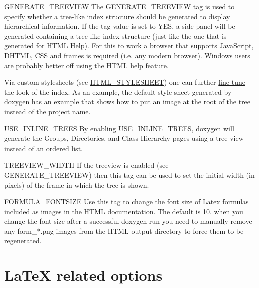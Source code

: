 \begin{DoxyDescription}
\label{config_cfg_generate_treeview}
\hypertarget{config_cfg_generate_treeview}{}
 
\item[{\ttfamily GENERATE\_\-TREEVIEW} ] The GENERATE\_\-TREEVIEW tag is used to specify whether a tree-\/like index structure should be generated to display hierarchical information. If the tag value is set to YES, a side panel will be generated containing a tree-\/like index structure (just like the one that is generated for HTML Help). For this to work a browser that supports JavaScript, DHTML, CSS and frames is required (i.e. any modern browser). Windows users are probably better off using the HTML help feature.

Via custom stylesheets (see \hyperlink{config_cfg_html_stylesheet}{HTML\_\-STYLESHEET}) one can further \hyperlink{doxygen_usage_doxygen_finetune}{fine tune} the look of the index. As an example, the default style sheet generated by doxygen has an example that shows how to put an image at the root of the tree instead of the \hyperlink{config_cfg_project_name}{project name}.

\label{config_cfg_use_inline_trees}
\hypertarget{config_cfg_use_inline_trees}{}
 
\item[{\ttfamily USE\_\-INLINE\_\-TREES} ] By enabling USE\_\-INLINE\_\-TREES, doxygen will generate the Groups, Directories, and Class Hierarchy pages using a tree view instead of an ordered list.

\label{config_cfg_treeview_width}
\hypertarget{config_cfg_treeview_width}{}
 
\item[{\ttfamily TREEVIEW\_\-WIDTH} ] If the treeview is enabled (see {\ttfamily GENERATE\_\-TREEVIEW}) then this tag can be used to set the initial width (in pixels) of the frame in which the tree is shown.

\label{config_cfg_formula_fontsize}
\hypertarget{config_cfg_formula_fontsize}{}
 
\item[{\ttfamily FORMULA\_\-FONTSIZE} ] Use this tag to change the font size of Latex formulas included as images in the HTML documentation. The default is 10. when you change the font size after a successful doxygen run you need to manually remove any {\ttfamily form\_\-$\ast$.png} images from the HTML output directory to force them to be regenerated.


\end{DoxyDescription}\hypertarget{config_latex_output}{}\section{LaTeX related options}\label{config_latex_output}
\label{config_cfg_generate_latex}
\hypertarget{config_cfg_generate_latex}{}
 
